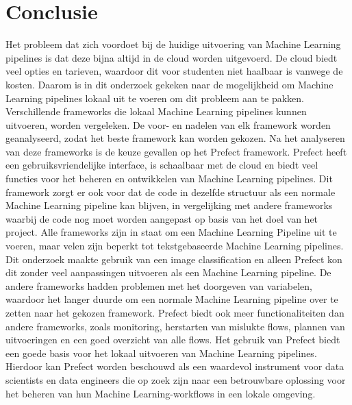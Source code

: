 
\chapter{Conclusie}%
\label{ch:conclusie}




Het probleem dat zich voordoet bij de huidige uitvoering van Machine Learning pipelines is dat deze bijna altijd in de cloud worden uitgevoerd. De cloud biedt veel opties en tarieven, waardoor dit voor studenten niet haalbaar is vanwege de kosten.
Daarom is in dit onderzoek gekeken naar de mogelijkheid om Machine Learning pipelines lokaal uit te voeren om dit probleem aan te pakken. Verschillende frameworks die lokaal Machine Learning pipelines kunnen uitvoeren, worden vergeleken. De voor- en nadelen van elk framework worden geanalyseerd, zodat het beste framework kan worden gekozen.
Na het analyseren van deze frameworks is de keuze gevallen op het Prefect framework. Prefect heeft een gebruiksvriendelijke interface, is schaalbaar met de cloud en biedt veel functies voor het beheren en ontwikkelen van Machine Learning pipelines. Dit framework zorgt er ook voor dat de code in dezelfde structuur als een normale Machine Learning pipeline kan blijven, in vergelijking met andere frameworks waarbij de code nog moet worden aangepast op basis van het doel van het project.
Alle frameworks zijn in staat om een Machine Learning Pipeline uit te voeren, maar velen zijn beperkt tot tekstgebaseerde Machine Learning pipelines. Dit onderzoek maakte gebruik van een image classification en alleen Prefect kon dit zonder veel aanpassingen uitvoeren als een Machine Learning pipeline. De andere frameworks hadden problemen met het doorgeven van variabelen, waardoor het langer duurde om een normale Machine Learning pipeline over te zetten naar het gekozen framework.
Prefect biedt ook meer functionaliteiten dan andere frameworks, zoals monitoring, herstarten van mislukte flows, plannen van uitvoeringen en een goed overzicht van alle flows. Het gebruik van Prefect biedt een goede basis voor het lokaal uitvoeren van Machine Learning pipelines.
Hierdoor kan Prefect worden beschouwd als een waardevol instrument voor data scientists en data engineers die op zoek zijn naar een betrouwbare oplossing voor het beheren van hun Machine Learning-workflows in een lokale omgeving.


